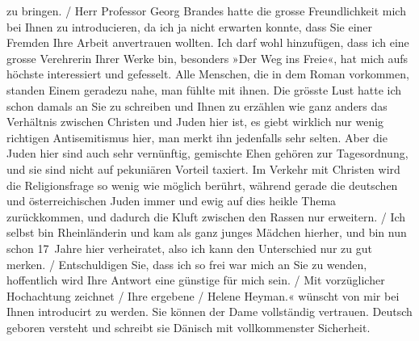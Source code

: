 \begin{ledgroupsized}[t]{13cm}
{{{                        zu bringen.{ / }Herr Professor Georg Brandes hatte
                        die grosse Freundlichkeit mich bei Ihnen zu introducieren, da ich ja nicht
                        erwarten konnte, dass Sie einer Fremden Ihre Arbeit anvertrauen wollten.
                        {\pb}Ich darf wohl hinzufügen, dass ich eine grosse Verehrerin Ihrer Werke
                        bin, besonders »Der Weg ins Freie«, hat
                        mich aufs höchste interessiert und gefesselt. Alle Menschen, die in dem
                        Roman vorkommen, standen Einem geradezu nahe, man fühlte mit ihnen. Die
                        grösste Lust hatte ich schon damals an Sie zu schreiben und Ihnen zu
                        erzählen wie ganz anders das Verhältnis zwischen Christen und Juden hier
                        ist, es giebt wirklich nur wenig richtigen Antisemitismus hier, man merkt
                        ihn jedenfalls sehr selten. Aber die Juden hier sind auch sehr
                        ver{\pb}nünftig, gemischte Ehen gehören zur Tagesordnung, und sie sind nicht
                        auf pekuniären Vorteil taxiert. Im Verkehr mit Christen wird die
                        Religionsfrage so wenig wie möglich berührt, während gerade die deutschen und österreichischen Juden immer und ewig auf dies heikle
                        Thema zurückkommen, und dadurch die Kluft zwischen den Rassen nur
                        erweitern.{ / }Ich selbst bin Rheinländerin und kam als ganz junges Mädchen hierher, und bin nun
                        schon 17 Jahre hier verheiratet, also ich kann den Unterschied nur {\pb}zu
                        gut merken.{ / }Entschuldigen Sie, dass ich so frei war mich an Sie zu wenden, hoffentlich
                        wird Ihre Antwort eine günstige für mich sein.{ / }Mit vorzüglicher Hochachtung zeichnet{ / }Ihre ergebene{ / }Helene Heyman.«}}}\label{K_L02049-1h} wünscht von mir bei Ihnen introducirt zu werden. Sie können der
               Dame vollständig vertrauen. Deutsch geboren versteht und schreibt sie Dänisch mit vollkommenster Sicherheit.\pend
           
         
         \endnumbering{}\end{ledgroupsized}  \newcommand{\dateiname}{L02049}\newcommand{\titel}{Georg Brandes an Arthur Schnitzler, vor dem 2. 12. 1911}\newcommand{\editorInnen}{Martin Anton Müller und Gerd-Hermann Susen}
      